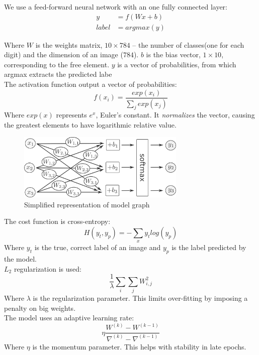 \documentclass[a4paper]{article}
\begin{document}
We use a feed-forward neural network with an one fully connected layer:
\begin{align*}
y &= f(Wx + b) \\
label &= argmax(y)
\end{align*}

Where $W$ is the weights matrix, $10 \times 784$ -- the number of classes(one for each digit) and the dimension of an image ($784$). $b$ is the bias vector, $1 \times 10$, corresponding to the free element. $y$ is a vector of probabilities, from which argmax extracts the predicted labe
\\

The activation function output a vector of probabilities:
$$f(x_i)=\frac{exp(x_i)}{\sum_j exp(x_j)}$$
Where $exp(x)$ represents $e^x$, Euler's constant. It \textit{normalizes} the vector, causing the greatest elements to have logarithmic relative value.
\\

\begin{figure}[htb]
\centering
\includegraphics[width=8cm]{images/model-graph.png}
\caption{Simplified representation of model graph \cite{tf}}
\end{figure}

The cost function is cross-entropy:
$$H(y_t, y_p)=-\sum_x y_t log(y_p)$$
Where $y_t$ is the true, correct label of an image and $y_p$ is the label predicted by the model.
\\

$L_2$ regularization is used:
$$\frac{1}{\lambda} \sum_i \sum_j W_{i,j}^2$$
Where $\lambda$ is the regularization parameter. This limits over-fitting by imposing a penalty on big weights.
\\

The model uses an adaptive learning rate:
$$\eta \frac{ W^{(k)} - W^{(k-1)} } { \nabla^{(k)} - \nabla^{(k-1)} }$$
Where $\eta$ is the momentum parameter. This helps with stability in late epochs.
\end{document}
